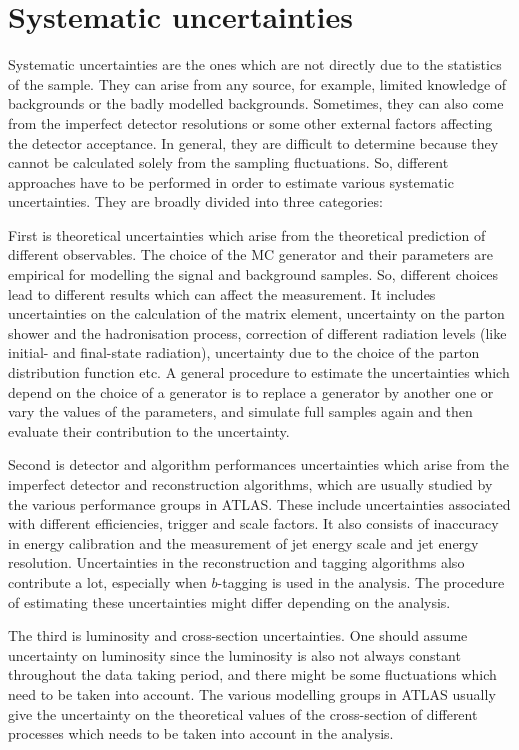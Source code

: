 \section{Systematic uncertainties}
\label{sec:uncertainties:systematics}
Systematic uncertainties are the ones which are not directly due to the statistics of the sample. They can arise from any source, for example, limited knowledge of backgrounds or the badly modelled backgrounds. Sometimes, they can also come from the imperfect detector resolutions or some other external factors affecting the detector acceptance. In general, they are difficult to determine because they cannot be calculated solely from the sampling fluctuations. So, different approaches have to be performed in order to estimate various systematic uncertainties. They are broadly divided into three categories:

First is theoretical uncertainties which arise from the theoretical prediction of different observables. The choice of the MC generator and their parameters are empirical for modelling the signal and background samples. So, different choices lead to different results which can affect the measurement. It includes uncertainties on the calculation of the matrix element, uncertainty on the parton shower and the hadronisation process, correction of different radiation levels (like initial- and final-state radiation), uncertainty due to the choice of the parton distribution function etc. A general procedure to estimate the uncertainties which depend on the choice of a generator is to replace a generator by another one or vary the values of the parameters, and simulate full samples again and then evaluate their contribution to the uncertainty.

Second is detector and algorithm performances uncertainties which arise from the imperfect detector and reconstruction algorithms, which are usually studied by the various performance groups in ATLAS. These include uncertainties associated with different efficiencies, trigger and scale factors. It also consists of inaccuracy in energy calibration and the measurement of jet energy scale and jet energy resolution. Uncertainties in the reconstruction and tagging algorithms also contribute a lot, especially when $b$-tagging is used in the analysis. The procedure of estimating these uncertainties might differ depending on the analysis.

The third is luminosity and cross-section uncertainties. One should assume uncertainty on luminosity since the luminosity is also not always constant throughout the data taking period, and there might be some fluctuations which need to be taken into account. The various modelling groups in ATLAS usually give the uncertainty on the theoretical values of the cross-section of different processes which needs to be taken into account in the analysis.

